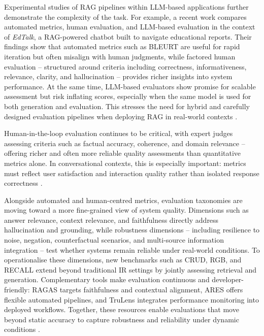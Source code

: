 \begin{spacing}{1.5}
Experimental studies of RAG pipelines within LLM-based applications further demonstrate the complexity of the task. For example, a recent work compares automated metrics, human evaluation, and LLM-based evaluation in the context of \textit{EdTalk}, a RAG-powered chatbot built to navigate educational reports. Their findings show that automated metrics such as BLEURT are useful for rapid iteration but often misalign with human judgments, while factored human evaluation -- structured around criteria including correctness, informativeness, relevance, clarity, and hallucination -- provides richer insights into system performance. At the same time, LLM-based evaluators show promise for scalable assessment but risk inflating scores, especially when the same model is used for both generation and evaluation. This stresses the need for hybrid and carefully designed evaluation pipelines when deploying RAG in real-world contexts \citep{abeysinghe_challenges_2024}.

Human-in-the-loop evaluation continues to be critical, with expert judges assessing criteria such as factual accuracy, coherence, and domain relevance -- offering richer and often more reliable quality assessments than quantitative metrics alone. In conversational contexts, this is especially important: metrics must reflect user satisfaction and interaction quality rather than isolated response correctness \citep{gupta_comprehensive_2024}.

Alongside automated and human-centred metrics, evaluation taxonomies are moving toward a more fine-grained view of system quality. Dimensions such as answer relevance, context relevance, and faithfulness directly address hallucination and grounding, while robustness dimensions -- including resilience to noise, negation, counterfactual scenarios, and multi-source information integration -- test whether systems remain reliable under real-world conditions. To operationalise these dimensions, new benchmarks such as CRUD, RGB, and RECALL extend beyond traditional IR settings by jointly assessing retrieval and generation. Complementary tools make evaluation continuous and developer-friendly: RAGAS targets faithfulness and contextual alignment, ARES offers flexible automated pipelines, and TruLens integrates performance monitoring into deployed workflows. Together, these resources enable evaluations that move beyond static accuracy to capture robustness and reliability under dynamic conditions \citep{gao_retrieval-augmented_2024}.


\end{spacing}
